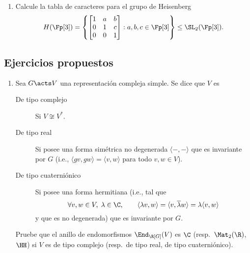 \documentclass[11pt, reqno]{amsart}
\begin{document}
\begin{enumerate}
		\newex
	\item Calcule la tabla de caracteres para el grupo de Heisenberg
		\[
			H(\Fp[3]) =
			\left\{
				\begin{bmatrix}
					1 & a & b \\
					0 & 1 & c \\
					0 & 0 & 1
				\end{bmatrix} : a, b, c \in \Fp[3]
			\right\} \le \SL_2(\Fp[3]).
		\]
\end{enumerate}

\begin{additional}
\appendix
\section{Ejercicios propuestos}
\begin{enumerate}
	\item Sea $G \acts V$ una representación compleja simple.
		Se dice que $V$ es
		\begin{description}
			\item[De tipo complejo] Si $V \not\cong V^*$.
			\item[De tipo real] Si posee una forma simétrica no degenerada $\langle -, - \rangle$ que es invariante por $G$
				(i.e., $\langle gv, gw \rangle = \langle v, w \rangle$ para todo $v, w \in V$).
			\item[De tipo cuaterniónico] Si posee una forma hermitiana (i.e., tal que
				\[
					\forall v, w \in V, \; \lambda \in \C, \qquad
					\langle \lambda v, w \rangle = \langle v, \overline{\lambda} w \rangle = \lambda \langle v, w \rangle
				\]
				y que es no degenerada) que es invariante por $G$.
		\end{description}
		Pruebe que el anillo de endomorfismos $\End_{\R[G]}(V)$ es $\C$ (resp.\ $\Mat_2(\R)$, $\HH$) si $V$ es de tipo complejo
		(resp.\ de tipo real, de tipo cuaterniónico).


\end{enumerate}
\end{additional}
\end{document}

